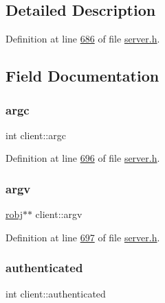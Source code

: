 \subsection{Detailed Description}


Definition at line \hyperlink{server_8h_source_l00686}{686} of file \hyperlink{server_8h_source}{server.\+h}.



\subsection{Field Documentation}
\mbox{\label{structclient_a55313c04093c5592241b58a0a25e92f2}} 
\subsubsection{\texorpdfstring{argc}{argc}}
{\footnotesize\ttfamily int client\+::argc}



Definition at line \hyperlink{server_8h_source_l00696}{696} of file \hyperlink{server_8h_source}{server.\+h}.

\mbox{\label{structclient_ab2db890ba4f68e6438e089b9896328b1}} 
\subsubsection{\texorpdfstring{argv}{argv}}
{\footnotesize\ttfamily \hyperlink{structredisObject}{robj}$\ast$$\ast$ client\+::argv}



Definition at line \hyperlink{server_8h_source_l00697}{697} of file \hyperlink{server_8h_source}{server.\+h}.

\mbox{\label{structclient_a2c99c8255a1ef51526f26d181b88cdcb}} 
\subsubsection{\texorpdfstring{authenticated}{authenticated}}
{\footnotesize\ttfamily int client\+::authenticated}



